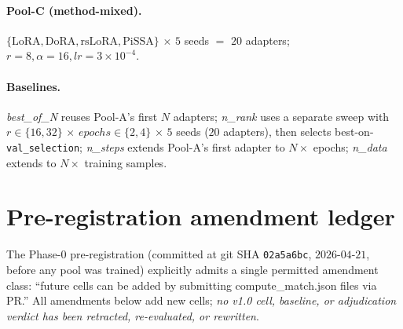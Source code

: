 \documentclass[11pt]{article}
\begin{document}
\paragraph{Pool-C (method-mixed).} $\{\text{LoRA}, \text{DoRA}, \text{rsLoRA}, \text{PiSSA}\}$ $\times$ $5$ seeds $=$ $20$ adapters; $r{=}8, \alpha{=}16, lr{=}3{\times}10^{-4}$.

\paragraph{Baselines.} \emph{best\_of\_N} reuses Pool-A's first $N$ adapters; \emph{n\_rank} uses a separate sweep with $r{\in}\{16, 32\}$ $\times$ $epochs{\in}\{2, 4\}$ $\times$ $5$ seeds ($20$ adapters), then selects best-on-\texttt{val\_selection}; \emph{n\_steps} extends Pool-A's first adapter to $N{\times}$ epochs; \emph{n\_data} extends to $N{\times}$ training samples.

\section{Pre-registration amendment ledger}\label{app:prereg}
The Phase-0 pre-registration (committed at git SHA \texttt{02a5a6bc}, $2026$-$04$-$21$, before any pool was trained) explicitly admits a single permitted amendment class: ``future cells can be added by submitting compute\_match.json files via PR.'' All amendments below add new cells; \emph{no v1.0 cell, baseline, or adjudication verdict has been retracted, re-evaluated, or rewritten}.
\end{document}
